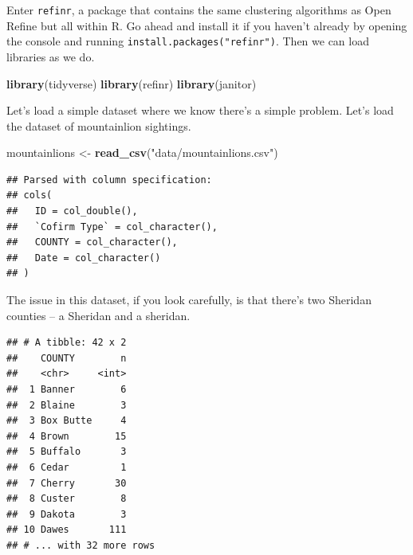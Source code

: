 \documentclass[]{book}
\newenvironment{Shaded}{\begin{snugshade}}{\end{snugshade}}
\newcommand{\KeywordTok}[1]{\textcolor[rgb]{0.13,0.29,0.53}{\textbf{#1}}}
\newcommand{\NormalTok}[1]{#1}
\newcommand{\OperatorTok}[1]{\textcolor[rgb]{0.81,0.36,0.00}{\textbf{#1}}}
\newcommand{\StringTok}[1]{\textcolor[rgb]{0.31,0.60,0.02}{#1}}
\begin{document}
Enter \texttt{refinr}, a package that contains the same clustering algorithms as Open Refine but all within R. Go ahead and install it if you haven't already by opening the console and running \texttt{install.packages("refinr")}. Then we can load libraries as we do.

\begin{Shaded}
\begin{Highlighting}[]
\KeywordTok{library}\NormalTok{(tidyverse)}
\KeywordTok{library}\NormalTok{(refinr)}
\KeywordTok{library}\NormalTok{(janitor)}
\end{Highlighting}
\end{Shaded}

Let's load a simple dataset where we know there's a simple problem. Let's load the dataset of mountainlion sightings.

\begin{Shaded}
\begin{Highlighting}[]
\NormalTok{mountainlions <-}\StringTok{ }\KeywordTok{read_csv}\NormalTok{(}\StringTok{"data/mountainlions.csv"}\NormalTok{)}
\end{Highlighting}
\end{Shaded}

\begin{verbatim}
## Parsed with column specification:
## cols(
##   ID = col_double(),
##   `Cofirm Type` = col_character(),
##   COUNTY = col_character(),
##   Date = col_character()
## )
\end{verbatim}

The issue in this dataset, if you look carefully, is that there's two Sheridan counties -- a Sheridan and a sheridan.

\begin{Shaded}
\end{Shaded}

\begin{verbatim}
## # A tibble: 42 x 2
##    COUNTY        n
##    <chr>     <int>
##  1 Banner        6
##  2 Blaine        3
##  3 Box Butte     4
##  4 Brown        15
##  5 Buffalo       3
##  6 Cedar         1
##  7 Cherry       30
##  8 Custer        8
##  9 Dakota        3
## 10 Dawes       111
## # ... with 32 more rows
\end{verbatim}
\end{document}

